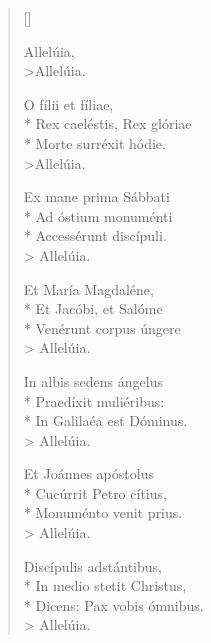 \newHymn



\settowidth{\versewidth}{Rex caelestis, Rex gloriae}

\begin{multicols}{2}
\begin{verse}[\versewidth]

 Allelúia,\\>Allelúia.

O fílii et fíliae,\\*
Rex caeléstis, Rex glóriae \\*
Morte surréxit hódie.\\>Allelúia.
\pointtrans

Ex mane prima Sábbati \\*
Ad óstium monuménti   \\*  
Accessérunt discípuli. \\> Allelúia.             

Et María Magdaléne,     \\*
Et Jacóbi, et Salóme    \\*
Venérunt corpus úngere \\> Allelúia.             

In albis sedens ángelus   \\*
Praedíxit muliéribus:     \\*
In Galilaéa est Dóminus. \\> Allelúia. 

Et Joánnes apóstolus \\*
Cucúrrit Petro cítius, \\*
Monuménto venit prius. \\> Allelúia.

Discípulis adstántibus,\\*
In medio stetit Christus,\\*
Dicens: Pax vobis ómnibus. \\> Allelúia. 


\end{verse}
\end{multicols}
